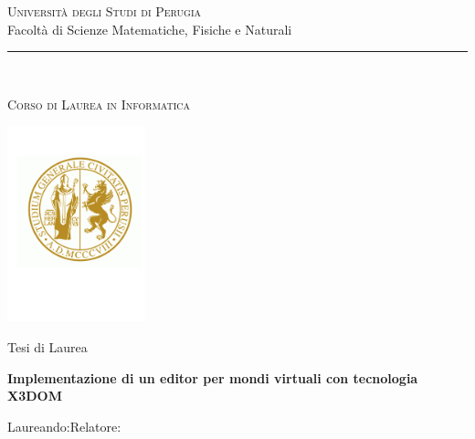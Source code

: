 \documentclass[a4paper,12pt]{report}
\title{\begin{large}\textbf{\titolotesi}\end{large}}
\author{\laureando}
\def\titolotesi{Implementazione di un editor per mondi virtuali con tecnologia X3DOM}
\begin{document}
\begin{titlepage}
\begin{center}
\textsc{\Large Universit\`{a} degli Studi di Perugia}\medskip\\

{\Large Facolt\`{a} di Scienze Matematiche, Fisiche e Naturali}\medskip\\

\rule{10mm}{0.01mm}\medskip\\

\small

\textsc{Corso di Laurea in Informatica}\\


\vspace*{3mm}

\includegraphics[width=4cm]{logounipg.png}

\vspace*{3mm}

\Large Tesi di Laurea \par\bigskip



{\large \bf \titolotesi \par}

\bigskip\bigskip\bigskip\bigskip

\end{center}\par

\hspace{0.1cm}Laureando:\hspace{7.3cm}Relatore:\par


\end{titlepage}
\end{document}
